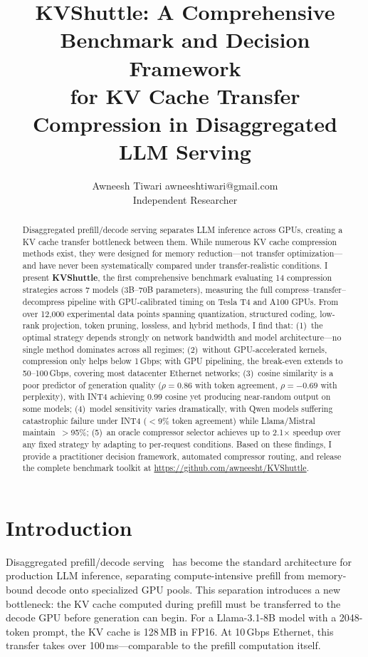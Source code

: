 \documentclass{article}
\title{KVShuttle: A Comprehensive Benchmark and Decision Framework\\for KV Cache Transfer Compression in Disaggregated LLM Serving}
\author{\name Awneesh Tiwari \email awneeshtiwari@gmail.com \\
  \addr Independent Researcher}
\begin{document}
\maketitle

\begin{abstract}
Disaggregated prefill/decode serving separates LLM inference across GPUs, creating a KV cache transfer bottleneck between them. While numerous KV cache compression methods exist, they were designed for memory reduction---not transfer optimization---and have never been systematically compared under transfer-realistic conditions. I present \textbf{KVShuttle}, the first comprehensive benchmark evaluating 14 compression strategies across 7 models (3B--70B parameters), measuring the full compress--transfer--decompress pipeline with GPU-calibrated timing on Tesla T4 and A100 GPUs. From over 12{,}000 experimental data points spanning quantization, structured coding, low-rank projection, token pruning, lossless, and hybrid methods, I find that: (1)~the optimal strategy depends strongly on network bandwidth and model architecture---no single method dominates across all regimes; (2)~without GPU-accelerated kernels, compression only helps below 1\,Gbps; with GPU pipelining, the break-even extends to 50--100\,Gbps, covering most datacenter Ethernet networks; (3)~cosine similarity is a poor predictor of generation quality ($\rho = 0.86$ with token agreement, $\rho = -0.69$ with perplexity), with INT4 achieving 0.99 cosine yet producing near-random output on some models; (4)~model sensitivity varies dramatically, with Qwen models suffering catastrophic failure under INT4 ($<$9\% token agreement) while Llama/Mistral maintain~$>$95\%; (5)~an oracle compressor selector achieves up to 2.1$\times$ speedup over any fixed strategy by adapting to per-request conditions. Based on these findings, I provide a practitioner decision framework, automated compressor routing, and release the complete benchmark toolkit at \url{https://github.com/awneesht/KVShuttle}.
\end{abstract}

\section{Introduction}
\label{sec:intro}

Disaggregated prefill/decode serving~\citep{zhong2024distserve, patel2024splitwise} has become the standard architecture for production LLM inference, separating compute-intensive prefill from memory-bound decode onto specialized GPU pools. This separation introduces a new bottleneck: the KV cache computed during prefill must be transferred to the decode GPU before generation can begin. For a Llama-3.1-8B model with a 2048-token prompt, the KV cache is 128\,MB in FP16. At 10\,Gbps Ethernet, this transfer takes over 100\,ms---comparable to the prefill computation itself.
\end{document}
